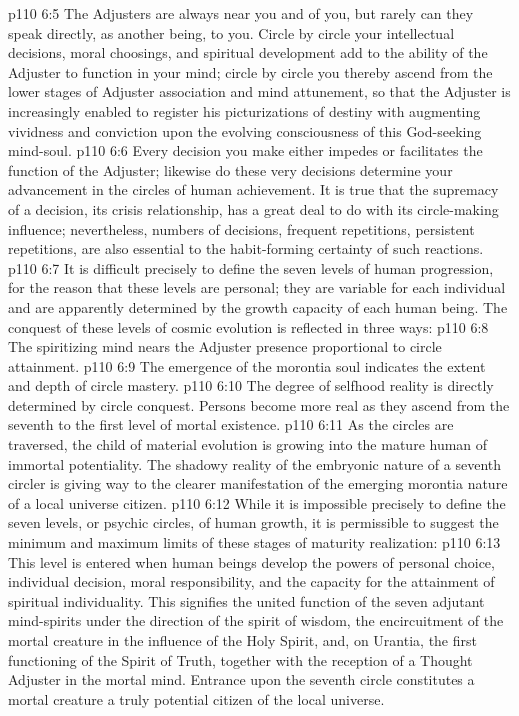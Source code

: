 \pc \vs p110 6:5 The Adjusters are always near you and of you, but rarely can they speak directly, as another being, to you. Circle by circle your intellectual decisions, moral choosings, and spiritual development add to the ability of the Adjuster to function in your mind; circle by circle you thereby ascend from the lower stages of Adjuster association and mind attunement, so that the Adjuster is increasingly enabled to register his picturizations of destiny with augmenting vividness and conviction upon the evolving consciousness of this God\hyp{}seeking mind\hyp{}soul.
\pc \vs p110 6:6 Every decision you make either impedes or facilitates the function of the Adjuster; likewise do these very decisions determine your advancement in the circles of human achievement. It is true that the supremacy of a decision, its crisis relationship, has a great deal to do with its circle\hyp{}making influence; nevertheless, numbers of decisions, frequent repetitions, persistent repetitions, are also essential to the habit\hyp{}forming certainty of such reactions.
\vs p110 6:7 It is difficult precisely to define the seven levels of human progression, for the reason that these levels are personal; they are variable for each individual and are apparently determined by the growth capacity of each human being. The conquest of these levels of cosmic evolution is reflected in three ways:\plusone
\pc \vs p110 6:8 \bibnobreakspace {} The spiritizing mind nears the Adjuster presence proportional to circle attainment.
\pc \vs p110 6:9 \bibnobreakspace {} The emergence of the morontia soul indicates the extent and depth of circle mastery.
\pc \vs p110 6:10 \bibnobreakspace {} The degree of selfhood reality is directly determined by circle conquest. Persons become more real as they ascend from the seventh to the first level of mortal existence.
\pc \vs p110 6:11 As the circles are traversed, the child of material evolution is growing into the mature human of immortal potentiality. The shadowy reality of the embryonic nature of a seventh circler is giving way to the clearer manifestation of the emerging morontia nature of a local universe citizen.
\vs p110 6:12 While it is impossible precisely to define the seven levels, or psychic circles, of human growth, it is permissible to suggest the minimum and maximum limits of these stages of maturity realization:
\pc \vs p110 6:13  This level is entered when human beings develop the powers of personal choice, individual decision, moral responsibility, and the capacity for the attainment of spiritual individuality. This signifies the united function of the seven adjutant mind\hyp{}spirits under the direction of the spirit of wisdom, the encircuitment of the mortal creature in the influence of the Holy Spirit, and, on Urantia, the first functioning of the Spirit of Truth, together with the reception of a Thought Adjuster in the mortal mind. Entrance upon the seventh circle constitutes a mortal creature a truly potential citizen of the local universe.
